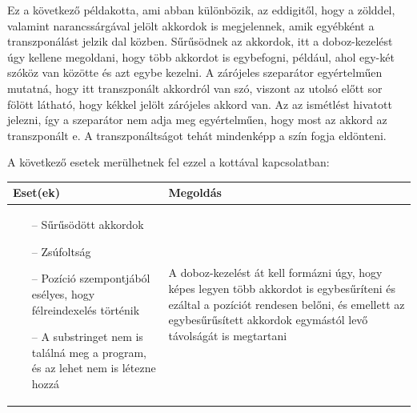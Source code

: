 Ez a következő példakotta, ami abban különbözik, az eddigitől, hogy a zölddel, valamint narancssárgával jelölt akkordok is megjelennek, amik egyébként a transzponálást jelzik dal közben. Sűrűsödnek az akkordok, itt a doboz-kezelést úgy kellene megoldani, hogy több akkordot is egybefogni, például, ahol egy-két szóköz van közötte és azt egybe kezelni. A zárójeles szeparátor egyértelműen mutatná, hogy itt transzponált akkordról van szó, viszont az utolsó előtt sor fölött látható, hogy kékkel jelölt zárójeles akkord van. Az az ismétlést hivatott jelezni, így a szeparátor nem adja meg egyértelműen, hogy most az akkord az transzponált e. A transzponáltságot tehát mindenképp a szín fogja eldönteni.

A következő esetek merülhetnek fel ezzel a kottával kapcsolatban:
\begin{center}
	\begin{tabular}{ |p{7cm}|p{7cm}| }
		\hline
		Eset(ek) & Megoldás\\ 
		\hline
		\begin{itemize}
			\item[--] Sűrűsödött akkordok
			\item[--] Zsúfoltság
			\item[--] Pozíció szempontjából esélyes, hogy félreindexelés történik
			\item[--] A substringet nem is találná meg a program, és az lehet nem is létezne hozzá
		\end{itemize} & A doboz-kezelést át kell formázni úgy, hogy képes legyen több akkordot is egybesűríteni és ezáltal a pozíciót rendesen belőni, és emellett az egybesűrűsített akkordok egymástól levő távolságát is megtartani \\ 
		\hline
	\end{tabular}
\end{center}
\newpage
